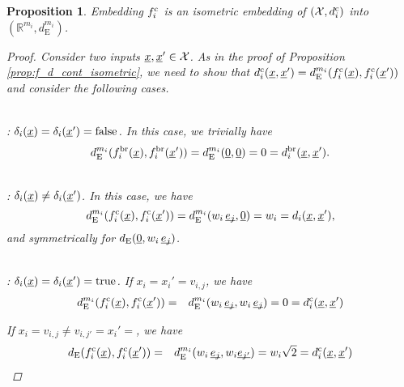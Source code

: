 \documentclass[letterpaper]{article}
\newcommand{\vect}[1]{\underline{\smash{#1}}}
\renewcommand{\v}[1]{\vect{#1}}
\newcommand{\reals}{\mathds{R}}
\newcommand{\sX}{\mathcal{X}}
\newcommand{\br}{^{\text{\textnormal{br}}}}
\newcommand{\cat}{^{\text{\textnormal{c}}}}
\newtheorem{prop}[thm]{Proposition}
\begin{document}
\begin{prop}Embedding $f\cat_i$ is an isometric embedding of $(\sX, d\cat_i)$ into $(\reals^{m_i},d_{\text{E}}^{m_i})$.
\label{prop:f_d_cat_isometric}
\begin{proof}
Consider two inputs $\v{x},\v{x}' \in \sX$. As in the proof of Proposition \ref{prop:f_d_cont_isometric}, we need to show that $d\cat_i(\v{x},\v{x}') = d_{\text{E}}^{m_i}(f\cat_i(\v{x}),f\cat_i(\v{x}'))$ and consider the following cases.

~\\: $\delta_i(\v{x}) = \delta_i(\v{x}') = \textrm{false}$.
In this case, we trivially have 
\[d_{\text{E}}^{m_i}(f_i\br(\v{x}),f_i\br(\v{x}')) = d_{\text{E}}^{m_i}(\v{0}, \v{0}) = 0 = d_i\br(\v{x},\v{x}').\]

~\\: $\delta_i(\v{x}) \neq \delta_i(\v{x}')$. In this case, we have
\[d_{\text{E}}^{m_i}(f\cat_i(\v{x}),f\cat_i(\v{x}')) = d_{\text{E}}^{m_i}(w_i\,\v{e_j}, \v{0}) = w_i = d_i(\v{x},\v{x}'),\]
and symmetrically for $d_{\text{E}}(\v{0}, w_i\,\v{e_j})$.

~\\: $\delta_i(\v{x}) = \delta_i(\v{x}') = \textrm{true}$. 
If $x_i=x_i'=v_{i,j}$, we have 
\begin{eqnarray}
\nonumber{}d_{\text{E}}^{m_i}(f\cat_i(\v{x}),f\cat_i(\v{x}')) & = & d_{\text{E}}^{m_i}(w_i\,\v{e_j}, w_i\,\v{e_j}) = 0 = d\cat_i(\v{x}, \v{x}')
\end{eqnarray}

\noindent{}If $x_i=v_{i,j} \neq v_{i,j'} = x_i'=$, we have 
\begin{eqnarray} 
\nonumber{}d_{\text{E}}(f\cat_i(\v{x}),f\cat_i(\v{x}')) & = & d_{\text{E}}^{m_i}(w_i\,\v{e_j}, w_i \v{e_{j'}}) = w_i \sqrt{2} = d\cat_i(\v{x}, \v{x}')
\end{eqnarray}
\end{proof}
\end{prop}

%
\end{document}
